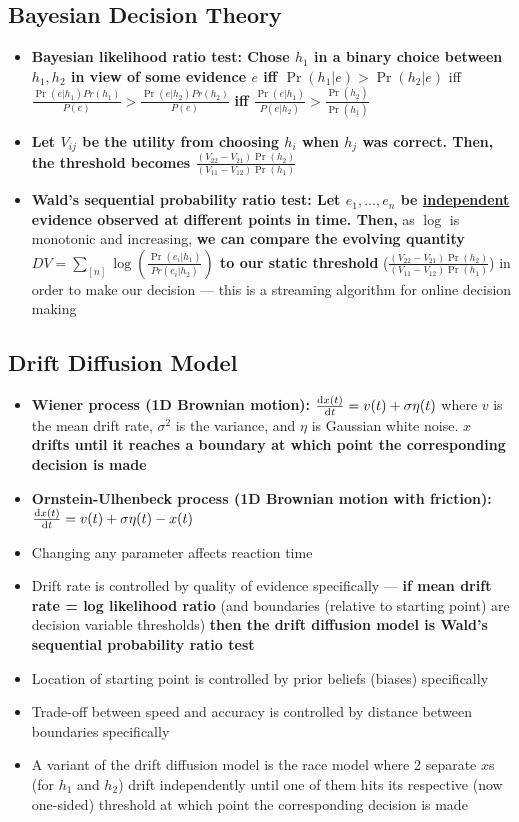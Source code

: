 \documentclass[20pt,a4paper,landscape]{extarticle}
\begin{document}
\begin{flushleft}
\subsection{Bayesian Decision Theory}
\begin{itemize}
\item \textbf{Bayesian likelihood ratio test: Chose \boldmath$h_1$ in a binary choice between $h_1, h_2$ in view of some evidence $e$ iff $\Pr(h_1|e) > \Pr(h_2|e)$} iff $\frac{\Pr(e|h_1)Pr(h_1)}{P(e)} > \frac{\Pr(e|h_2)Pr(h_2)}{P(e)}$ \textbf{iff \boldmath$\frac{\Pr(e|h_1)}{P(e|h_2)} > \frac{\Pr(h_{\underline{2}})}{\Pr(h_{\underline{1}})}$}
\item \textbf{Let $V_{ij}$ be the utility from choosing $h_i$ when $h_j$ was correct. Then, the threshold becomes \boldmath$\frac{\left(V_{22}-V_{21}\right)\Pr(h_2)}{\left(V_{11}-V_{12}\right)\Pr(h_1)}$}
\item \textbf{Wald's sequential probability ratio test: Let \boldmath$e_1, ..., e_n$ be \underline{independent} evidence observed at different points in time. Then,} as $\log$ is monotonic and increasing, \textbf{we can compare the evolving quantity \boldmath$DV = \sum_{[n]} \log(\frac{\Pr(e_i|h_1)}{Pr(e_i|h_2)})$ to our static threshold} ($\frac{\left(V_{22}-V_{21}\right)\Pr(h_2)}{\left(V_{11}-V_{12}\right)\Pr(h_1)}$) in order to make our decision --- this is a streaming algorithm for online decision making
\end{itemize}
\subsection{Drift Diffusion Model}
\begin{itemize}
\item \textbf{Wiener process (1D Brownian motion): \boldmath$\odv{x(t)}{t} = v(t) + \sigma \eta(t)$} where $v$ is the mean drift rate, $\sigma^2$ is the variance, and $\eta$ is Gaussian white noise. \textbf{\boldmath$x$ drifts until it reaches a boundary at which point the corresponding decision is made}
\item \textbf{Ornstein-Ulhenbeck process (1D Brownian motion with friction): \boldmath$\odv{x(t)}{t} = v(t) + \sigma \eta(t) - x(t)$}
\item Changing any parameter affects reaction time
\item Drift rate is controlled by quality of evidence specifically --- \textbf{if mean drift rate = log likelihood ratio} (and boundaries (relative to starting point) are decision variable thresholds) \textbf{then the drift diffusion model is Wald's sequential probability ratio test}
\item Location of starting point is controlled by prior beliefs (biases) specifically
\item Trade-off between speed and accuracy is controlled by distance between boundaries specifically
\item A variant of the drift diffusion model is the race model where 2 separate $x$s (for $h_1$ and $h_2$) drift independently until one of them hits its respective (now one-sided) threshold at which point the corresponding decision is made
\end{itemize}
\clearpage

\end{flushleft}
\end{document}
